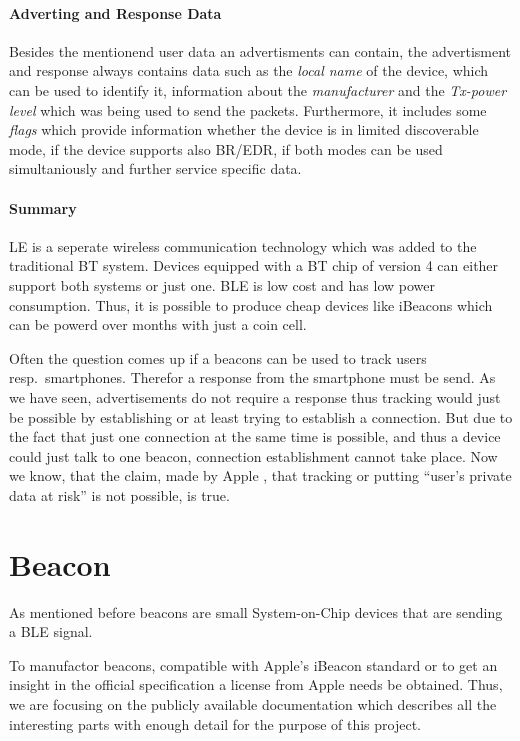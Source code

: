\paragraph{Adverting and Response Data}
Besides the mentionend user data an advertisments can contain, the advertisment and response always contains data such as the \emph{local name} of the device, which can be used to identify it, information about the \emph{manufacturer} and the \emph{Tx-power level} which was being used to send the packets.
Furthermore, it includes some \emph{flags} which provide information whether the device is in limited discoverable mode, if the device supports also \acs{BR}/\acs{EDR}, if both modes can be used simultaniously and further service specific data.


\paragraph{Summary}
\acl{LE} is a seperate wireless communication technology which was added to the traditional \acl{BT} system.
Devices equipped with a \acs{BT} chip of version 4 can either support both systems or just one.
\acs{BLE} is low cost and has low power consumption. Thus, it is possible to produce cheap devices like iBeacons which can be powerd over months with just a coin cell.

Often the question comes up if a beacons can be used to track users resp.\ smartphones.
Therefor a response from the smartphone must be send. As we have seen, advertisements do not require a response thus tracking would just be possible by establishing or at least trying to establish a connection.
But due to the fact that just one connection at the same time is possible, and thus a device could just talk to one beacon, connection establishment cannot take place.
Now we know, that the claim, made by Apple \cite{apple:getting_started}, that tracking or putting ``user's private data at risk'' is not possible, is true.

\section{Beacon}\label{sec:beacon}
As mentioned before beacons are small System-on-Chip devices that are sending a \acs{BLE} signal.

To manufactor beacons, compatible with Apple's iBeacon standard or to get an insight in the official specification a license from Apple needs be obtained.
Thus, we are focusing on the publicly available documentation which describes all the interesting parts with enough detail for the purpose of this project.

